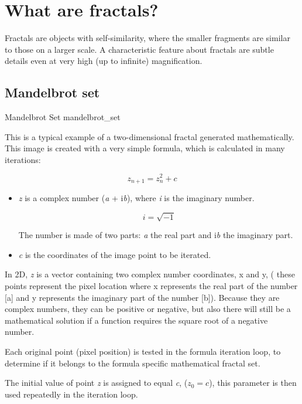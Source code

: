 \section{What are fractals?}\label{what-are-fractals}

Fractals are objects with self-similarity, where the smaller fragments are
similar to those on a larger scale. A characteristic feature about fractals are subtle
details even at very high (up to infinite) magnification.

\subsection{Mandelbrot set}\label{mandelbrot-set}

{Mandelbrot Set}
{mandelbrot_set}

This is a typical example of a two-dimensional fractal generated mathematically.
This image is created with a very simple formula, which is calculated in many
iterations:

\[z_{n + 1} = z_{n}^{2} + c\]

\begin{itemize}
		
		
	\item\emph{z} is a complex number (\emph{a} + i\emph{b}), where \emph{i} is
	the imaginary number.
		
	\[ i = \sqrt{-1} \]
		
	The number is made of two parts: \emph{a} the real part and i\emph{b} the
	imaginary part.
		
	\item\emph{c} is the coordinates of the image point to be iterated.
\end{itemize}

In 2D, \emph{z} is a vector containing two complex number coordinates, x and y,
( these points represent the pixel location where x represents the real part of
the number {[}a{]} and y represents the imaginary part of the number {[}b{]}).
Because they are complex numbers, they can be positive or negative, but also
there will still be a mathematical solution if a function requires the square
root of a negative number.

Each original point (pixel position) is tested in the formula iteration loop, to
determine if it belongs to the formula specific mathematical fractal set.

The initial value of point \emph{z} is assigned to equal \emph{c}, ($ z_{0} = c
$), this parameter is then used repeatedly in the iteration loop.

